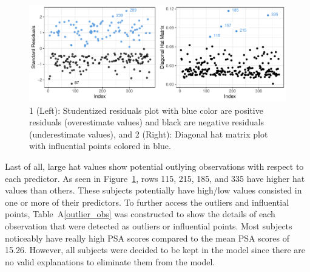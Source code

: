 \documentclass[11pt]{article}\usepackage[]{graphicx}\usepackage[]{color}
\makeatletter
\def\maxwidth{ %
  \ifdim\Gin@nat@width>\linewidth
    \linewidth
  \else
    \Gin@nat@width
  \fi
}
\makeatother
\begin{document}
\begin{figure}[h!] 
\begin{center}

\includegraphics[width=\maxwidth]{figure/unnamed-chunk-5-1} 

\caption{1 (Left): Studentized residuals plot with blue color are positive residuals (overestimate values) and black are negative residuals (underestimate values), and 2 (Right): Diagonal hat matrix plot with influential points colored in blue.}
\label{model_plot_2}
\end{center} 
\end{figure}

\noindent Last of all, large hat values show potential outlying observations with respect to each predictor. As seen in Figure~\ref{model_plot_2}, rows 115, 215, 185, and 335 have higher hat values than others. These subjects potentially have high/low values consisted in one or more of their predictors. To further access the outliers and influential points, Table~A\ref{outlier_obs} was constructed to show the details of each observation that were detected as outliers or influential points. Most subjects noticeably have really high PSA scores compared to the mean PSA scores of 15.26. However, all subjects were decided to be kept in the model since there are no valid explanations to eliminate them from the model.       
\hfill \break
\end{document}
